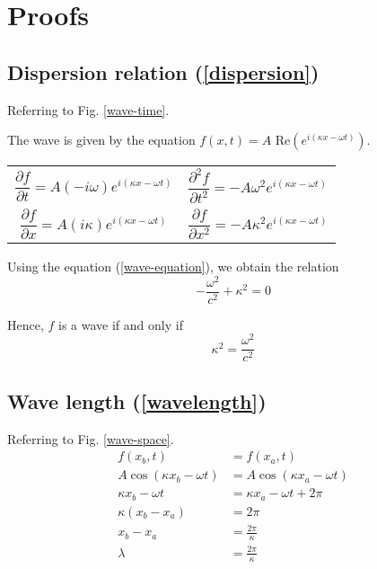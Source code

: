 \documentclass{article}
\begin{document}
\newpage
\section*{Proofs}

\subsection*{Dispersion relation (\ref{dispersion})}
\label{sec:dispersion-relation-proof}
Referring to Fig. \ref{wave-time}.

The wave is given by the equation $f(x,t) = A \text{ Re}{(e^{i(\kappa x - \omega t)})} $.

\bgroup
\def\arraystretch{2.5}
\begin{center}
\begin{tabular}{cc}
 $\dfrac{\partial f}{\partial t} = A(-i\omega)e^{i(\kappa x - \omega t)}$
 & $\dfrac{\partial^2 f}{\partial t^2} = -A\omega^2e^{i(\kappa x - \omega t)}$ \\
 $\dfrac{\partial f}{\partial x} = A(i\kappa)e^{i(\kappa x - \omega t)}$
 & $\dfrac{\partial f}{\partial x^2} = -A\kappa^2e^{i(\kappa x - \omega t)}$\\
\end{tabular}
\end{center}
\egroup

Using the equation (\ref{wave-equation}), we obtain the relation
$$
-\frac{\omega^2}{c^2} + \kappa^2 = 0
$$

Hence, $f$ is a wave if and only if
$$
\kappa ^2 = \frac{\omega ^2}{c^2}
$$


\subsection*{Wave length (\ref{wavelength})}
\label{sec:wave-length-proof}
Referring to Fig. \ref{wave-space}.
$$
\begin{aligned}
    f(x_b, t) & = f(x_a, t) \\
    A \cos{(\kappa x_b - \omega t)} & = A \cos{(\kappa x_a - \omega t)} \\
    \kappa x_b - \omega t & = \kappa x_a - \omega t + 2\pi \\
    \kappa (x_b - x_a) & = 2\pi \\
    x_b - x_a & = \frac{2\pi}{\kappa}\\
    \lambda & = \frac{2\pi}{\kappa}
\end{aligned}
$$
\end{document}
